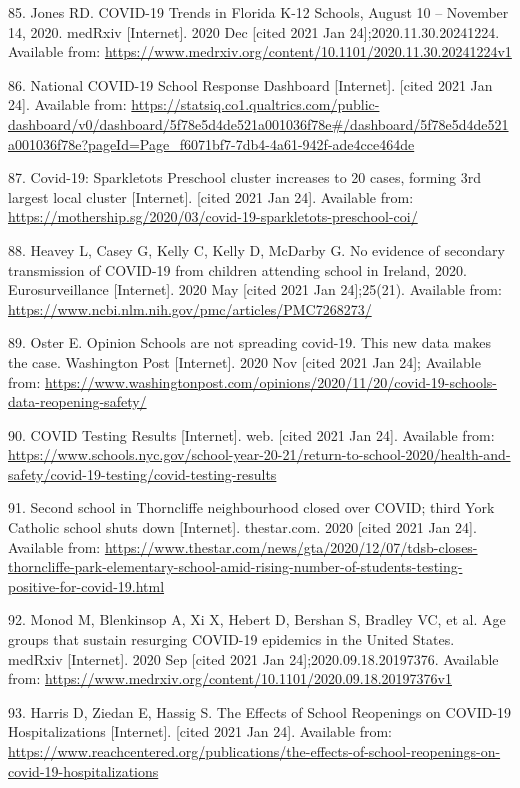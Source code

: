 \documentclass[
]{article}
\begin{document}
\leavevmode\hypertarget{ref-jones_covid-19_2020}{}%
85. Jones RD. COVID-19 Trends in Florida K-12 Schools, August 10 --
November 14, 2020. medRxiv {[}Internet{]}. 2020 Dec {[}cited 2021 Jan
24{]};2020.11.30.20241224. Available from:
\url{https://www.medrxiv.org/content/10.1101/2020.11.30.20241224v1}

\leavevmode\hypertarget{ref-noauthor_national_nodate}{}%
86. National COVID-19 School Response Dashboard {[}Internet{]}. {[}cited
2021 Jan 24{]}. Available from:
\url{https://statsiq.co1.qualtrics.com/public-dashboard/v0/dashboard/5f78e5d4de521a001036f78e\#/dashboard/5f78e5d4de521a001036f78e?pageId=Page_f6071bf7-7db4-4a61-942f-ade4cce464de}

\leavevmode\hypertarget{ref-noauthor_covid-19_nodate-1}{}%
87. Covid-19: Sparkletots Preschool cluster increases to 20 cases,
forming 3rd largest local cluster {[}Internet{]}. {[}cited 2021 Jan
24{]}. Available from:
\url{https://mothership.sg/2020/03/covid-19-sparkletots-preschool-coi/}

\leavevmode\hypertarget{ref-heavey_no_2020}{}%
88. Heavey L, Casey G, Kelly C, Kelly D, McDarby G. No evidence of
secondary transmission of COVID-19 from children attending school in
Ireland, 2020. Eurosurveillance {[}Internet{]}. 2020 May {[}cited 2021
Jan 24{]};25(21). Available from:
\url{https://www.ncbi.nlm.nih.gov/pmc/articles/PMC7268273/}

\leavevmode\hypertarget{ref-oster_opinion_2020}{}%
89. Oster E. Opinion Schools are not spreading covid-19. This new data
makes the case. Washington Post {[}Internet{]}. 2020 Nov {[}cited 2021
Jan 24{]}; Available from:
\url{https://www.washingtonpost.com/opinions/2020/11/20/covid-19-schools-data-reopening-safety/}

\leavevmode\hypertarget{ref-noauthor_covid_nodate}{}%
90. COVID Testing Results {[}Internet{]}. web. {[}cited 2021 Jan 24{]}.
Available from:
\url{https://www.schools.nyc.gov/school-year-20-21/return-to-school-2020/health-and-safety/covid-19-testing/covid-testing-results}

\leavevmode\hypertarget{ref-noauthor_second_2020}{}%
91. Second school in Thorncliffe neighbourhood closed over COVID; third
York Catholic school shuts down {[}Internet{]}. thestar.com. 2020
{[}cited 2021 Jan 24{]}. Available from:
\url{https://www.thestar.com/news/gta/2020/12/07/tdsb-closes-thorncliffe-park-elementary-school-amid-rising-number-of-students-testing-positive-for-covid-19.html}

\leavevmode\hypertarget{ref-monod_age_2020}{}%
92. Monod M, Blenkinsop A, Xi X, Hebert D, Bershan S, Bradley VC, et al.
Age groups that sustain resurging COVID-19 epidemics in the United
States. medRxiv {[}Internet{]}. 2020 Sep {[}cited 2021 Jan
24{]};2020.09.18.20197376. Available from:
\url{https://www.medrxiv.org/content/10.1101/2020.09.18.20197376v1}

\leavevmode\hypertarget{ref-harris_effects_nodate}{}%
93. Harris D, Ziedan E, Hassig S. The Effects of School Reopenings on
COVID-19 Hospitalizations {[}Internet{]}. {[}cited 2021 Jan 24{]}.
Available from:
\url{https://www.reachcentered.org/publications/the-effects-of-school-reopenings-on-covid-19-hospitalizations}
\end{document}
